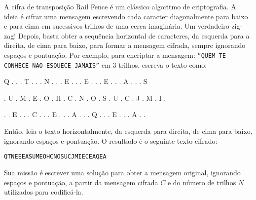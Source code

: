 A cifra de transposição Rail Fence é um clássico algoritmo de criptografia. A ideia é cifrar uma mensagem escrevendo cada caracter diagonalmente para baixo e para cima em sucessivos trilhos de uma cerca imaginária. Um verdadeiro zig-zag! Depois, basta obter a sequência horizontal de caracteres, da esquerda para a direita, de cima para baixo, para formar a mensagem cifrada, sempre ignorando espaços e pontuação.
Por exemplo, para encriptar a mensagem: \texttt{“QUEM TE CONHECE NAO ESQUECE JAMAIS”} em 3 trilhos, escreva o texto como:




\begin{center}
\small
\begin{verb} 
Q  .  .  .  T  .  .  .  N  .  .  .  E  .  .  .  E  .  .  .  E  .  .  .  A  .  .  .  S
\end{verb} 
\begin{verb}
.  U  .  M  .  E  .  O  .  H  .  C  .  N  .  O  .  S  .  U  .  C  .  J  .  M  .  I  . 
\end{verb} 
\begin{verb}
.  .  E  .  .  .  C  .  .  .  E  .  .  .  A  .  .  .  Q  .  .  .  E  .  .  .  A  .  . 
\end{verb}
\end{center}


\normalsize
Então, leia o texto horizontalmente, da esquerda para direita, de cima para baixo, ignorando espaços e pontuação. O resultado é o seguinte texto cifrado:

\begin{verbatim}
QTNEEEASUMEOHCNOSUCJMIECEAQEA
\end{verbatim}

Sua missão é escrever uma solução para obter a mensagem original, ignorando espaços e pontuação, a partir da mensagem cifrada $C$ e do número de trilhos $N$ utilizados para codificá-la.

